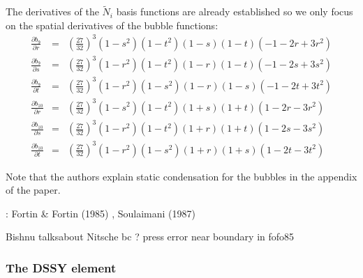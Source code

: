 The derivatives of the $\tilde{N}_i$ basis functions are already established so we only focus on the spatial derivatives of the bubble functions:
\begin{eqnarray}
\frac{\partial b_9}{\partial r} 
&=& \left(\frac{27}{32}\right)^3 (1-s^2)(1-t^2) (1-s)(1-t) (-1-2r+3r^2  )\nonumber\\
\frac{\partial b_9}{\partial s}
&=& \left(\frac{27}{32}\right)^3 (1-r^2)(1-t^2) (1-r)(1-t) (-1-2s+3s^2  )\nonumber\\
\frac{\partial b_9}{\partial t}
&=& \left(\frac{27}{32}\right)^3 (1-r^2)(1-s^2) (1-r)(1-s) (-1-2t+3t^2  )\nonumber\\
\frac{\partial b_{10}}{\partial r} 
&=& \left(\frac{27}{32}\right)^3 (1-s^2)(1-t^2) (1+s)(1+t) (1-2r-3r^2  )\nonumber\\
\frac{\partial b_{10}}{\partial s}
&=& \left(\frac{27}{32}\right)^3 (1-r^2)(1-t^2) (1+r)(1+t) (1-2s-3s^2  )\nonumber\\
\frac{\partial b_{10}}{\partial t} 
&=& \left(\frac{27}{32}\right)^3 (1-r^2)(1-s^2) (1+r)(1+s) (1-2t-3t^2  ) \nonumber
\end{eqnarray}

Note that the authors explain static condensation for the bubbles in the appendix of the paper.


\Literature: Fortin \& Fortin (1985) \cite{fofo85}, Soulaimani \etal (1987) \cite{sofo87}

Bishnu talksabout Nitsche bc ? press error near boundary in fofo85



\newpage
\subsubsection{The DSSY element} \label{ss:dssy_3D}



